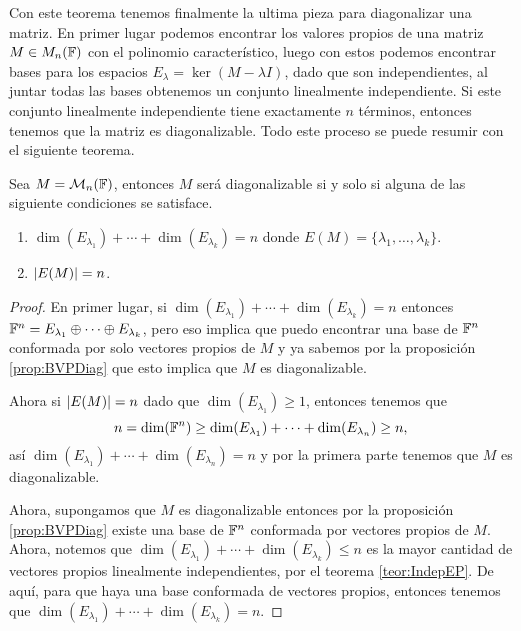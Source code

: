 Con este teorema tenemos finalmente la ultima pieza para diagonalizar una matriz. En primer lugar podemos encontrar los valores propios de una matriz $M\in M_n(\mathbb{F})$ con el polinomio característico, luego con estos podemos encontrar bases para los espacios $E_\lambda = \ker(M-\lambda I)$, dado que son independientes, al juntar todas las bases obtenemos un conjunto linealmente independiente. Si este conjunto linealmente independiente tiene exactamente $n$ términos, entonces tenemos que la matriz es diagonalizable. Todo este proceso se puede resumir con el siguiente teorema.

\begin{teor}\label{teor:DiagCond}
  Sea $M = \mathcal{M}_n(\mathbb{F})$, entonces $M$ será diagonalizable si y solo si alguna de las siguiente condiciones se satisface.
  \begin{enumerate}
    \item $\dim(E_{\lambda_1}) + \cdots + \dim(E_{\lambda_k}) = n$ donde $E(M) = \{\lambda_1, \ldots, \lambda_k\}$.
    \item $\mathopen|E(M)\mathclose| = n$.
  \end{enumerate}
\end{teor}
\begin{proof}
  En primer lugar, si $\dim(E_{\lambda_1}) + \cdots + \dim(E_{\lambda_k}) = n$ entonces $\mathbb{F}^n = E_{\lambda_1} \oplus \cdots \oplus E_{\lambda_k}$, pero eso implica que puedo encontrar una base de $\mathbb{F}^n$ conformada por solo vectores propios de $M$ y ya sabemos por la proposición \ref{prop:BVPDiag} que esto implica que $M$ es diagonalizable.

  Ahora si $\mathopen|E(M)\mathclose| = n$ dado que $\dim(E_{\lambda_1}) \geq 1$, entonces tenemos que
  \[ n = \dim(\mathbb{F}^n) \geq \dim(E_{\lambda_1}) + \cdots + \dim(E_{\lambda_n}) \geq n, \]
  así $\dim(E_{\lambda_1}) + \cdots + \dim(E_{\lambda_n}) = n$ y por la primera parte tenemos que $M$ es diagonalizable.

  Ahora, supongamos que $M$ es diagonalizable entonces por la proposición \ref{prop:BVPDiag} existe una base de $\mathbb{F}^n$ conformada por vectores propios de $M$. Ahora, notemos que $\dim(E_{\lambda_1}) + \cdots + \dim(E_{\lambda_k}) \leq n$ es la mayor cantidad de vectores propios linealmente independientes, por el teorema \ref{teor:IndepEP}. De aquí, para que haya una base conformada de vectores propios, entonces tenemos que $\dim(E_{\lambda_1}) + \cdots + \dim(E_{\lambda_k}) = n$.
\end{proof}

